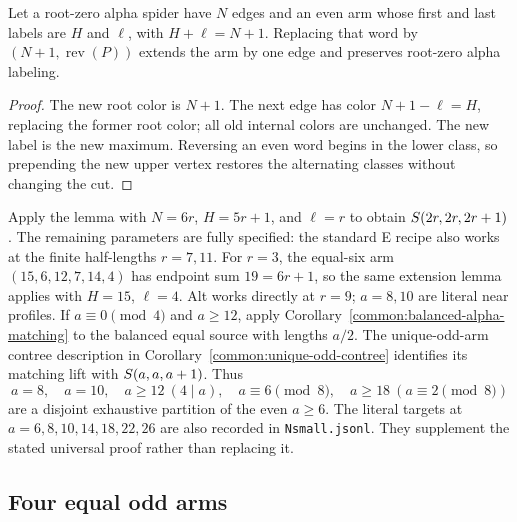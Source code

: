 \begin{lemma}\label{templates:reverse-extend}
Let a root-zero alpha spider have $N$ edges and an even arm whose
first and last labels are $H$ and $\ell$, with $H+\ell=N+1$.
Replacing that word by $(N+1,\operatorname{rev}(P))$ extends the
arm by one edge and preserves root-zero alpha labeling.
\end{lemma}
\begin{proof}
The new root color is $N+1$.  The next edge has color
$N+1-\ell=H$, replacing the former root color; all old internal
colors are unchanged.  The new label is the new maximum.  Reversing
an even word begins in the lower class, so prepending the new upper
vertex restores the alternating classes without changing the cut.
\end{proof}

Apply the lemma with $N=6r$, $H=5r+1$, and $\ell=r$ to obtain
$S\!\left(2r,2r,2r+1\right)$.  The remaining parameters are fully specified:
the standard E recipe also works at the finite half-lengths
$r=7,11$.  For $r=3$, the equal-six arm
$(15,6,12,7,14,4)$ has endpoint sum $19=6r+1$, so the same
extension lemma applies with $H=15$, $\ell=4$.
Alt works directly at $r=9$; $a=8,10$ are literal near profiles.
If $a\equiv0\pmod4$
and $a\ge12$, apply Corollary~\ref{common:balanced-alpha-matching}
to the balanced equal source with lengths $a/2$. The unique-odd-arm
contree description in Corollary~\ref{common:unique-odd-contree}
identifies its matching lift with $S\!\left(a,a,a+1\right)$.  Thus
\[
 a=8,\quad a=10,\quad a\ge12\ (4\mid a),\quad
 a\equiv6\pmod8,\quad a\ge18\ (a\equiv2\pmod8)
\]
are a disjoint exhaustive partition of the even $a\ge6$.
The literal targets at $a=6,8,10,14,18,22,26$ are also recorded
in \texttt{Nsmall.jsonl}.  They supplement the stated universal
proof rather than replacing it.

\subsection{Four equal odd arms}
\label{templates:four-odd}\label{construction:equal-odd-alpha4}

